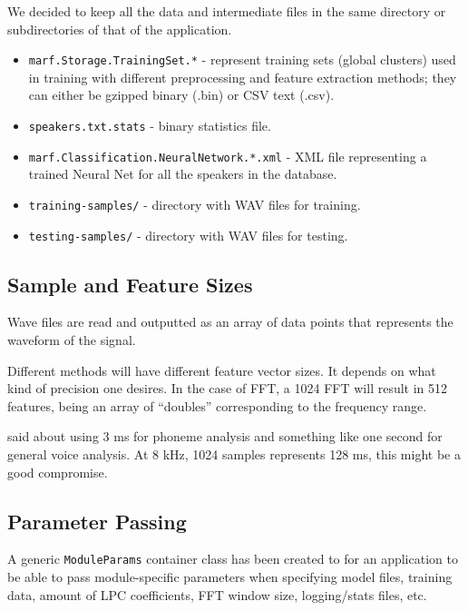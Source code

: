 We decided to keep all the data and intermediate files in the same
directory or subdirectories of that of the application.

\begin{itemize}

\item \verb+marf.Storage.TrainingSet.*+ - represent training sets
	(global clusters) used in training with different preprocessing and feature extraction
	methods; they can either be gzipped binary (.bin) or CSV text (.csv).

\item \verb+speakers.txt.stats+ - binary statistics file.

\item \verb+marf.Classification.NeuralNetwork.*.xml+ - XML file representing a trained
	Neural Net for all the speakers in the database.

\item \verb+training-samples/+ - directory with WAV files for training.

\item \verb+testing-samples/+ - directory with WAV files for testing.

\end{itemize}

\subsection{Sample and Feature Sizes}

Wave files are read and outputted as an array of
data points that represents the waveform of the signal.

Different methods will have different feature vector sizes.
It depends on what kind of precision one desires.
In the case of FFT, a 1024 FFT will result in 512 features,
being an array of ``doubles'' corresponding to the frequency range.

\cite{shaughnessy2000} said about using 3 ms for phoneme analysis and
something like one second for general voice analysis.  At 8 kHz, 1024 samples
represents 128 ms, this might be a good compromise.

\subsection{Parameter Passing}

A generic \verb+ModuleParams+ container class has been created to for an application
to be able to pass module-specific parameters when
specifying model files, training data,
amount of LPC coefficients, FFT window size, logging/stats files, etc.

